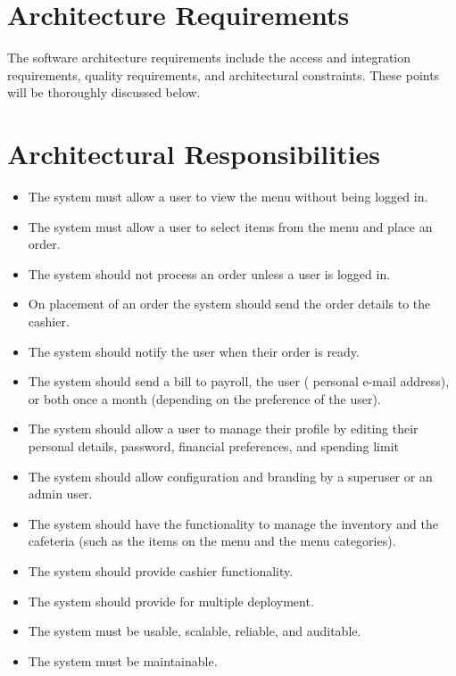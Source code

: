 \documentclass[a4paper,12pt]{article}
\begin{document}
\section{Architecture Requirements}
The software architecture requirements include the access and integration requirements, quality
requirements, and architectural constraints. These points will be thoroughly discussed below.

\section{Architectural Responsibilities}
\begin{itemize}

\item The system must allow a user to view the menu without being logged in.
\item The system must allow a user to select items from the menu and place an order.
\item The system should not process an order unless a user is logged in.
\item On placement of an order the system should send the order details to the cashier.
\item The system should notify the user when their order is ready.
\item The system should send a bill to payroll, the user ( personal e-mail address), or both once a month (depending on the preference of the user).
\item The system should allow a user to manage their profile by editing their personal details, password, financial preferences, and spending limit
\item The system should allow configuration and branding by a superuser or an admin user.
\item The system should have the functionality to manage the inventory and the cafeteria (such as the items on the menu and the menu categories).
\item The system should provide cashier functionality.
\item The system should provide for multiple deployment.
\item The system must be usable, scalable, reliable, and auditable.
\item The system must be maintainable.

\end{itemize}
\end{document}
